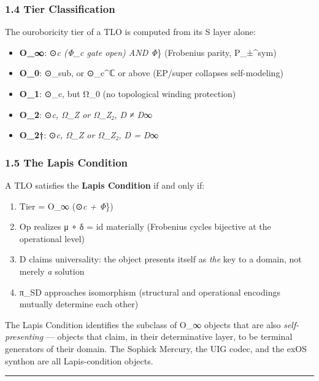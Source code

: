 \subsubsection{1.4 Tier Classification}\label{tier-classification}

The ouroboricity tier of a TLO is computed from its S layer alone:

\begin{itemize}
\tightlist
\item
  \textbf{O\_∞}: ⊙\emph{c (Φ\_c gate open) AND Φ}\} (Frobenius parity,
  P\_±\^{}sym)
\item
  \textbf{O\_0}: ⊙\_sub, or ⊙\_c\^{}ℂ or above (EP/super collapses
  self-modeling)
\item
  \textbf{O\_1}: ⊙\_c, but Ω\_0 (no topological winding protection)
\item
  \textbf{O\_2}: ⊙\emph{c, Ω\_Z or Ω\_Z₂, D ≠ D}∞
\item
  \textbf{O\_2†}: ⊙\emph{c, Ω\_Z or Ω\_Z₂, D = D}∞
\end{itemize}

\subsubsection{1.5 The Lapis Condition}\label{the-lapis-condition}

A TLO satisfies the \textbf{Lapis Condition} if and only if:

\begin{enumerate}
\def\labelenumi{\arabic{enumi}.}
\tightlist
\item
  Tier = O\_∞ (⊙\emph{c + Φ}\})
\item
  Op realizes μ ∘ δ = id materially (Frobenius cycles bijective at the
  operational level)
\item
  D claims universality: the object presents itself as \emph{the} key to
  a domain, not merely \emph{a} solution
\item
  π\_SD approaches isomorphism (structural and operational encodings
  mutually determine each other)
\end{enumerate}

The Lapis Condition identifies the subclass of O\_∞ objects that are
also \emph{self-presenting} --- objects that claim, in their
determinative layer, to be terminal generators of their domain. The
Sophick Mercury, the UIG codec, and the exOS synthon are all
Lapis-condition objects.

\begin{center}\rule{0.5\linewidth}{0.5pt}\end{center}


